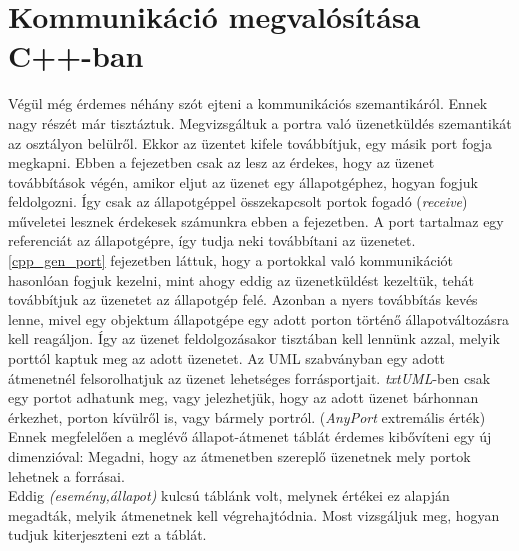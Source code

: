 \documentclass[a4paper,12pt]{report}
\begin{document}
\section{Kommunikáció megvalósítása C++-ban}
Végül még érdemes néhány szót ejteni a kommunikációs szemantikáról. Ennek nagy részét már tisztáztuk. Megvizsgáltuk a portra való üzenetküldés szemantikát az osztályon belülről. Ekkor az üzentet kifele továbbítjuk, egy másik port fogja megkapni. Ebben a fejezetben csak az lesz az érdekes, hogy az üzenet továbbítások végén, amikor eljut az üzenet egy állapotgéphez, hogyan fogjuk feldolgozni. Így csak az állapotgéppel összekapcsolt portok fogadó (\textit{receive}) műveletei lesznek érdekesek számunkra ebben a fejezetben. A port tartalmaz egy referenciát az állapotgépre, így tudja neki továbbítani az üzenetet. \ref{cpp_gen_port} fejezetben láttuk, hogy a portokkal való kommunikációt hasonlóan fogjuk kezelni, mint ahogy eddig az üzenetküldést kezeltük, tehát továbbítjuk az üzenetet az állapotgép felé. Azonban a nyers továbbítás kevés lenne, mivel egy objektum állapotgépe egy adott porton történő állapotváltozásra kell reagáljon. Így az üzenet feldolgozásakor tisztában kell lennünk azzal, melyik porttól kaptuk meg az adott üzenetet. Az UML szabványban egy adott átmenetnél felsorolhatjuk az üzenet lehetséges forrásportjait. \textit{txtUML}-ben csak egy portot adhatunk meg, vagy jelezhetjük, hogy az adott üzenet bárhonnan érkezhet, porton kívülről is, vagy bármely portról. (\textit{AnyPort} extremális érték) Ennek megfelelően a meglévő állapot-átmenet táblát érdemes kibővíteni egy új dimenzióval: Megadni, hogy az átmenetben szereplő üzenetnek mely portok lehetnek a forrásai. \\
Eddig \textit{(esemény,állapot)} kulcsú táblánk volt, melynek értékei ez alapján megadták, melyik átmenetnek kell végrehajtódnia. \cite{hack_dip} Most vizsgáljuk meg, hogyan tudjuk kiterjeszteni ezt a táblát.
\end{document}
